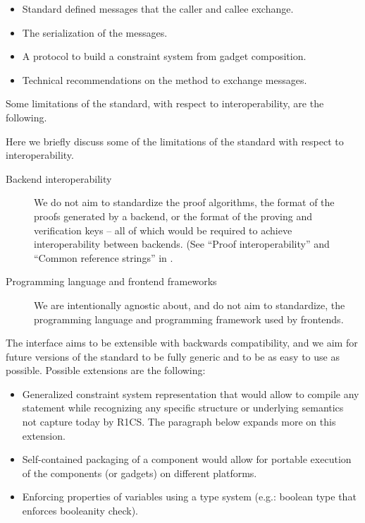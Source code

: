 \documentclass[a4paper,12pt]{article}
\newcommand{\dnote}[1]{\dtcolornote[Daniel]{red}{#1}}
\begin{document}
\begin{itemize}
	\item Standard defined messages that the caller and callee exchange.
	\item The serialization of the messages.
	\item A protocol to build a constraint system from gadget composition.
	\item Technical recommendations on the method to exchange messages.
\end{itemize}

Some limitations of the standard, with respect to interoperability, are the following.

Here we briefly discuss some of the limitations of the standard with respect to interoperability.
\begin{description}
	\item [Backend interoperability] We do not aim to standardize the proof algorithms, the format of the proofs generated by a backend, or the format of the proving and verification keys -- all of which would be required to achieve interoperability between backends. (See ``Proof interoperability'' and ``Common reference strings'' in \dnote{[ref the impl track]}.
	\item [Programming language and frontend frameworks] We are intentionally agnostic about, and do not aim to standardize, the programming language and programming framework used by frontends.
\end{description}

The interface aims to be extensible with backwards compatibility, and we aim for future versions of the standard to be fully generic and to be as easy to use as possible. Possible extensions are the following:

\begin{itemize}
	\item Generalized constraint system representation that would allow to compile any statement while recognizing any specific structure or underlying semantics not capture today by R1CS. The paragraph below expands more on this extension.
	\item Self-contained packaging of a component would allow for portable execution of the components (or gadgets) on different platforms.
	\item Enforcing properties of variables using a type system (e.g.: boolean type that enforces booleanity check).
\end{itemize}
\end{document}
